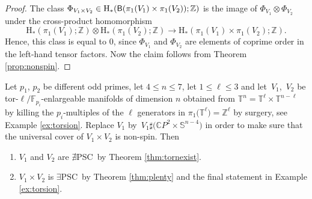 \documentclass[pdftex]{sigma}
\numberwithin{equation}{section}
\newcommand{\F}{\mathbb{F}}
\newcommand{\Z}{\mathbb{Z}}
\newcommand{\SSS}{\mathbb{S}}
\newcommand{\TTT}{\mathbb{T}}
\newcommand{\sB}{{\sf B}}
\newcommand{\myicon}{$\,\,\,\triangleright$}
\newcommand{\no}{{\color{brown!70!black}$\nexists$}{\sf PSC}}
\newcommand{\yes}{{\color {blue!70!black}$\exists$}{\sf PSC}}
\newcommand{\Ho}{\mathrm{H}}
\begin{document}
\begin{proof} The class $\Phi_{V_1 \times V_2} \in \Ho_*(\sB ( \pi_1(V_1) \times \pi_1(V_2)); \Z)$ is the image of $\Phi_{V_1} \otimes \Phi_{V_2}$ under the cross-product homomorphism
\[
 \Ho_*( \pi_1(V_1); \Z) \otimes \Ho_* ( \pi_1(V_2); \Z) \to \Ho_* ( \pi_1(V_1) \times \pi_1(V_2); \Z) .
\]
Hence, this class is equal to $0$, since $\Phi_{V_1}$ and $\Phi_{V_2}$ are elements of coprime order in the left-hand tensor factors.
Now the claim follows from Theorem \ref{prop:nonspin}.
\end{proof}

\begin{Example} \label{interesting}
Let $p_1$, $p_2$ be different odd primes, let $4 \leq n \leq 7$, let $1 \leq \ell \leq 3$ and let~$V_1$,~$V_2 $ be tor-$\ell /\F_{p_i}$-enlargeable manifolds of dimension $n$ obtained from ${\TTT}^{n} = {\TTT}^{\ell} \times {\TTT}^{n-\ell}$ by killing the $p_i$-multiples of the $\ell$ generators in $\pi_1\big({\TTT}^\ell\big) =\Z^{\ell}$ by surgery, see Example \ref{ex:torsion}.
Replace $V_1$ by~${V_1 \sharp \big( \mathbb{C}P^2 \times \SSS^{n-4} \big)}$ in order to make sure that the universal cover of $V_1 \times V_2$ is non-spin.
Then
\begin{enumerate}[\myicon]\itemsep=0pt
 \item $V_1$ and $V_2$ are \no~by Theorem \ref{thm:tornexist}.
 \item $V_1 \times V_2$ is \yes~by Theorem \ref{thm:plenty} and the final statement in Example \ref{ex:torsion}.
\end{enumerate}
\end{Example}
\end{document}
